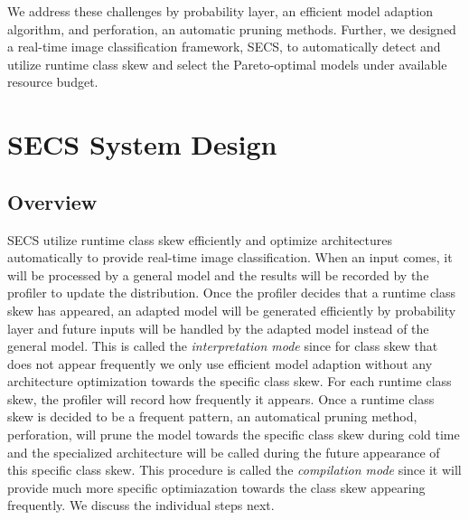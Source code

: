 \documentclass[pageno]{jpaper}
\begin{document}
We address these challenges by probability layer, an efficient model adaption algorithm, and perforation, an automatic pruning methods. Further, we designed a real-time image classification framework, SECS, to automatically detect and utilize runtime class skew and select the Pareto-optimal models under available resource budget.
























\section{SECS System Design}
\subsection{Overview}
SECS utilize runtime class skew efficiently and optimize architectures automatically to provide real-time image classification. When an input comes, it will be processed by a general model and the results will be recorded by the profiler to update the distribution. Once the profiler decides that a runtime class skew has appeared, an adapted model will be generated efficiently by probability layer and future inputs will be handled by the adapted model instead of the general model. This is called the \textit{interpretation mode} since for class skew that does not appear frequently we only use efficient model adaption without any architecture optimization towards the specific class skew. For each runtime class skew, the profiler will record how frequently it appears. Once a runtime class skew is decided to be a frequent pattern, an automatical pruning method, perforation, will prune the model towards the specific class skew during cold time and the specialized architecture will be called during the future appearance of this specific class skew. This procedure is called the \textit{compilation mode} since it will provide much more specific optimiazation towards the class skew appearing frequently. We discuss the individual steps next.
\end{document}
